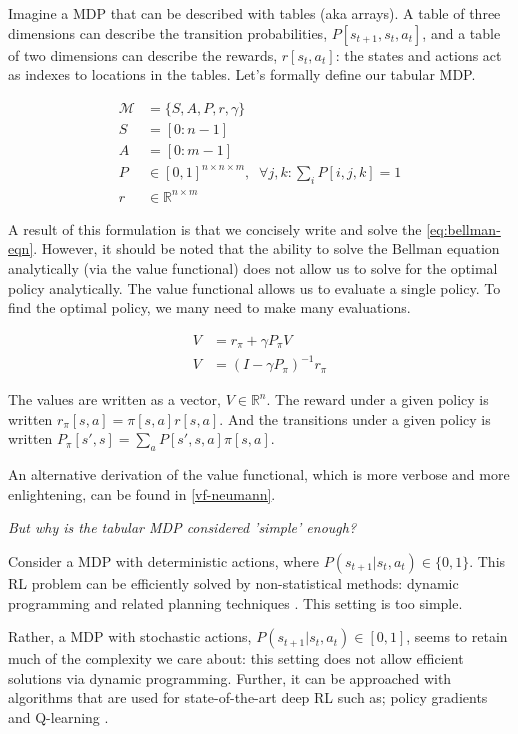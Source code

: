 Imagine a MDP that can be described with tables (aka arrays). A table of
three dimensions can describe the transition probabilities, $P[s_{t+1}, s_t, a_t]$,
and a table of two dimensions can describe the rewards, $r[s_t, a_t]$: the
states and actions act as indexes to locations in the tables.
Let's formally define our tabular MDP. \footnotemark[23]


\begin{align}
\mathcal M &= \{S, A, P, r, \gamma\}\; \tag{the MDP}\\
S &= [0:n-1] \tag{the state space}\\
A &= [0:m-1] \tag{the action space}\\
P &\in [0,1]^{n\times n \times m}, \;\;\forall j, k : \sum_i P[i, j, k] = 1 \tag{the transition fn.}\\
r &\in \mathbb R^{n\times m} \tag{the reward fn.}
\end{align}

A result of this formulation is that we concisely write and solve the \eqref{eq:bellman-eqn}.
However, it should be noted that the ability to solve the Bellman equation analytically (via the value functional)
does not allow us to solve for the optimal policy analytically. The value functional allows us to evaluate a single policy.
To find the optimal policy, we many need to make many evaluations.

\begin{align}
V &= r_{\pi} + \gamma P_{\pi} V \tag{tabular Bellman eqn}\\
V &= (I-\gamma P_{\pi})^{-1}r_{\pi}  \label{eq:value-functional}\tag{Value functional}
\end{align}

The values are written as a vector, $V \in \mathbb R^n$.
The reward under a given policy is written $r_{\pi}[s, a] = \pi[s, a] r[s, a]$.
And the transitions under a given policy is written $P_{\pi}[s', s] = \sum_a P[s', s, a]\pi[s, a]$.

An alternative derivation of the value functional, which is more verbose and more enlightening, can be found in \ref{vf-neumann}.

\begin{displayquote}
\textsl{But why is the tabular MDP considered 'simple' enough?}
\end{displayquote}

Consider a MDP with deterministic actions, where $P(s_{t+1}|s_t, a_t) \in \{ 0, 1\}$.
This RL problem can be efficiently solved by non-statistical
methods: dynamic programming and related planning techniques \cite{Bertsekas1995}.
This setting is too simple.

Rather, a MDP with stochastic actions, $P(s_{t+1}|s_t, a_t) \in [0, 1]$,
seems to retain much of the complexity we care about: this setting does not allow
efficient solutions via dynamic programming. Further, it can be approached with algorithms
that are used for state-of-the-art deep RL such as;
policy gradients \cite{Schulman2015a} and Q-learning \cite{Mnih2015}.
